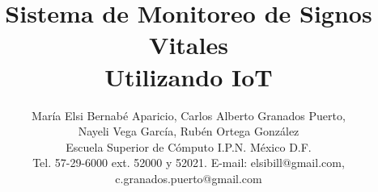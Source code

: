 \documentclass[journal]{IEEEtran}
\begin{document}
	
\renewcommand{\tablename}{Tabla} 
	
	
%
\title{Sistema de Monitoreo de Signos Vitales\\ Utilizando IoT}
%
%
%

\author{María Elsi Bernabé Aparicio, Carlos Alberto Granados Puerto,\\ Nayeli Vega García, Rubén Ortega González\\
Escuela Superior de Cómputo I.P.N. México D.F.\\
Tel. 57-29-6000 ext. 52000 y 52021. E-mail: elsibill@gmail.com, c.granados.puerto@gmail.com}%

% 
%
\end{document}
